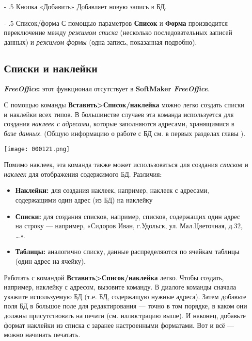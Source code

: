 ﻿\documentclass[a4paper,10pt]{article}
\makeatletter
\renewcommand\paragraph{%
   \@startsection{paragraph}{4}{0mm}%
      {-\baselineskip}%
      {.5\baselineskip}%
      {\normalfont\normalsize\bfseries}}
\makeatother
\begin{document}
\paragraph{Кнопка «Добавить»}
Добавляет новую запись в БД.

\paragraph{Список/форма}
С помощью параметров \textbf{Список} и  \textbf{Форма} производится переключение между \textit{режимом списка} (несколько последовательных записей данных) и \textit{режимом формы} (одна запись, показанная подробно).

\subsection{Списки и наклейки}
\begin{mdframed}[backgroundcolor=pink!50]
\textbf{\textit{FreeOffice}:} этот функционал отсутствует в \textbf{SoftMaker \textit{FreeOffice}}.
\end{mdframed}

С помощью команды \textbf{Вставить>Список/наклейка} можно легко создать списки и наклейки всех типов. В большинстве случаев эта команда используется для создания \textit{наклеек с адресами}, которые заполняются адресами, хранящимися в \textit{базе данных}. (Общую информацию о работе с БД см. в первых разделах главы ).

\texttt{[image: 000121.png]}

Помимо наклеек, эта команда также может использоваться для создания \textit{списков} и \textit{наклеек} для отображения содержимого БД. Различия:
\begin{itemize}
 \item \textbf{Наклейки:} для создания наклеек, например, наклеек с адресами, содержащими один адрес (из БД) на наклейку
 \item \textbf{Списки:} для создания списков, например, списков, содержащих один адрес на строку — например, «Сидоров Иван, г.Удольск, ул. Мал.Цветочная, д.32, …».
 \item \textbf{Таблицы:} аналогично списку, данные распределяются по ячейкам таблицы (один адрес на ячейку).
\end{itemize}

Работать с командой \textbf{Вставить>Список/наклейка} легко. Чтобы создать, например, наклейку с адресом, вызовите команду. В диалоге команды сначала укажите используемую БД (т.е. БД, содержащую нужные адреса). Затем добавьте поля БД в большое поле для редактирования — точно в том порядке, в каком они должны присутствовать на печати (см. иллюстрацию выше). И наконец, добавьте формат наклейки из списка с заранее настроенными форматами. Вот и всё — можно начинать печатать.
\end{document}
